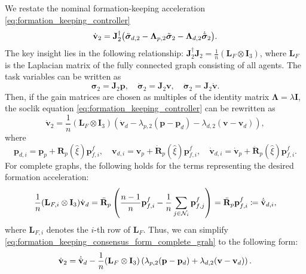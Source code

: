 We restate the nominal formation-keeping acceleration \eqref{eq:formation_keeping_controller}
\begin{equation}
    \dot{\mathbf{v}}_2 = \mathbf{J}_2^\dagger \bigl(\ddot{\bm{\sigma}}_{d,2} - \mathbf{\Lambda}_{p,2}\Tilde{\bm{\sigma}}_2 - \mathbf{\Lambda}_{d,2} \dot{\Tilde{\bm{\sigma}}}_2\bigl).
\end{equation}
The key insight lies in the following relationship: $\mathbf{J}_2^\dagger\mathbf{J}_2 = \tfrac{1}{n}(\mathbf{L}_F\otimes \mathbf{I}_3)$, where $\mathbf{L}_F$ is the Laplacian matrix of the fully connected graph consisting of all agents. The task variables can be written as 
\begin{equation}
    \mathbf{\sigma}_2 = \mathbf{J}_2\mathbf{p}, \quad \dot{\mathbf{\sigma}}_2 = \mathbf{J}_2\mathbf{v}, \quad \ddot{\mathbf{\sigma}}_2 = \mathbf{J}_2\dot{\mathbf{v}}.
\end{equation}
Then, if the gain matrices are chosen as multiples of the identity matrix $\bm{\Lambda} = \lambda \mathbf{I}$, the \gls{soclik} equation \eqref{eq:formation_keeping_controller} can be rewritten as
\begin{equation}\label{eq:formation_keeping_consensus_form_complete_grah}
    \dot{\mathbf{v}}_2 = \frac{1}{n}(\mathbf{L}_F\otimes \mathbf{I}_3)\left(\dot{\mathbf{v}}_d - \lambda_{p,2}(\mathbf{p}-\mathbf{p}_d) - \lambda_{d,2}(\mathbf{v} - \mathbf{v}_d)\right),
\end{equation}
where
\begin{equation}\label{eq:desired_formation}
    \mathbf{p}_{d,i} = \mathbf{p}_p + \mathbf{R}_p(\hat{\xi}) \mathbf{p}_{f,i}^f, \quad \mathbf{v}_{d,i} = \mathbf{v}_p + \dot{\mathbf{R}}_p(\hat{\xi}) \mathbf{p}_{f,i}^f, \quad \dot{\mathbf{v}}_{d,i} = \dot{\mathbf{v}}_p + \ddot{\mathbf{R}}_p(\hat{\xi}) \mathbf{p}_{f,i}^f.
\end{equation}
For complete graphs, the following holds for the terms representing the desired formation acceleration:
\begin{equation}\label{eq:desired_formation_ddot}
    \frac{1}{n}(\mathbf{L}_{F,i}\otimes\mathbf{I}_3)\dot{\mathbf{v}}_d = \ddot{\mathbf{R}}_p\left(\frac{n-1}{n} \mathbf{p}_{f,i}^f - \frac{1}{n}\sum_{j\in \mathcal{N}_i} \mathbf{p}_{f,j}^f\right) = \ddot{\mathbf{R}}_p\mathbf{p}_{f,i}^f \coloneqq \dot{\Tilde{\mathbf{v}}}_{d,i},
\end{equation}
where $\mathbf{L}_{F,i}$ denotes the $i$-th row of $\mathbf{L}_F$. Thus, we can simplify \eqref{eq:formation_keeping_consensus_form_complete_grah} to the following form:
\begin{equation}\label{eq:formation_keeping_consensus_form_complete_grah2}
    \dot{\mathbf{v}}_2 = \dot{\Tilde{\mathbf{v}}}_{d} -\frac{1}{n}(\mathbf{L}_F\otimes \mathbf{I}_3)\left(\lambda_{p,2}(\mathbf{p}-\mathbf{p}_d) + \lambda_{d,2}(\mathbf{v} - \mathbf{v}_d)\right).
\end{equation}

